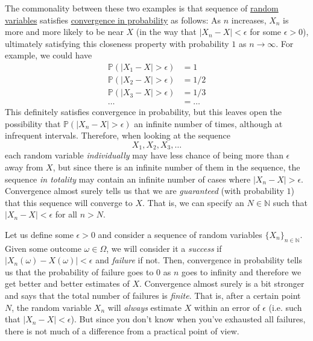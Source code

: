   The commonality between these two examples is that sequence of \hyperref[def:random-variable]{random variables} satisfies \hyperref[def:convergence-in-probability]{convergence in probability} as follows: As $n$ increases, $X_n$ is more and more likely to be near $X$ (in the way that $|X_n - X| < \epsilon$ for some $\epsilon > 0$), ultimately satisfying this closeness property with probability $1$ as $n \rightarrow \infty$. For example, we could have 
  \begin{align*}
    \mathbb{P}(|X_1 - X| > \epsilon) & = 1 \\
    \mathbb{P}(|X_2 - X| > \epsilon) & = 1/2 \\
    \mathbb{P}(|X_3 - X| > \epsilon) & = 1/3 \\
    \ldots & = \ldots 
  \end{align*}
  This definitely satisfies convergence in probability, but this leaves open the possibility that $\mathbb{P}(|X_n - X| > \epsilon)$ an infinite number of times, although at infrequent intervals. Therefore, when looking at the sequence 
  \begin{equation}
    X_1, X_2, X_3, \ldots
  \end{equation}
  each random variable \textit{individually} may have less chance of being more than $\epsilon$ away from $X$, but since there is an infinite number of them in the sequence, the sequence \textit{in totality} may contain an infinite number of cases where $|X_n - X| > \epsilon$. Convergence almost surely tells us that we are \textit{guaranteed} (with probability $1$) that this sequence will converge to $X$. That is, we can specify an $N \in \mathbb{N}$ such that $|X_n - X| < \epsilon$ for all $n > N$. 

  Let us define some $\epsilon > 0$ and consider a sequence of random variables $\{X_n\}_{n \in \mathbb{N}}$. Given some outcome $\omega \in \Omega$, we will consider it a \textit{success} if $|X_n(\omega) - X(\omega)| < \epsilon$ and \textit{failure} if not. Then, convergence in probability tells us that the probability of failure goes to $0$ as $n$ goes to infinity and therefore we get better and better estimates of $X$. Convergence almost surely is a bit stronger and says that the total number of failures is \textit{finite}. That is, after a certain point $N$, the random variable $X_n$ will \textit{always} estimate $X$ within an error of $\epsilon$ (i.e. such that $|X_n - X| < \epsilon$). But since you don't know when you've exhausted all failures, there is not much of a difference from a practical point of view. 

